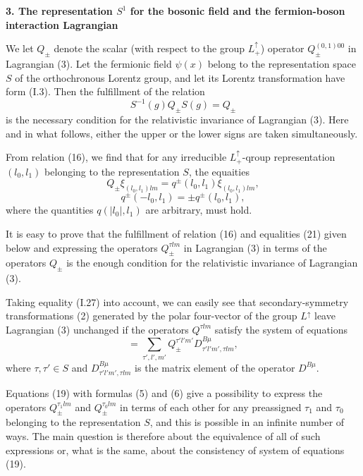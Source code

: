 \documentclass[a4paper,12pt]{article}
\begin{document}
\begin{center}
{\large \bf 3. The representation $S^{1}$ for the bosonic field and the
fermion-boson interaction Lagrangian}
\end{center}

We let $Q_{\pm}$ denote the scalar (with respect to the group 
$L^{\uparrow}_{+}$) operator $Q^{(0,1)00}_{\pm}$ in Lagrangian (3). Let the
fermionic field $\psi (x)$ belong to the representation space $S$ of the
orthochronous Lorentz group, and let its Lorentz transformation have form 
(I.3). Then the fulfillment of the relation
\begin{equation}
S^{-1}(g) Q_{\pm} S(g) = Q_{\pm}
\end{equation}
is the necessary condition for the relativistic invariance of Lagrangian (3).
Here and in what follows, either the upper or the lower signs are taken
simultaneously.

From relation (16), we find that for any irreducible $L^{\uparrow}_{+}$-qroup
representation $(l_{0},l_{1})$ belonging to the representation $S$, the
equaities 
\begin{equation}
Q_{\pm} \xi_{(l_{0},l_{1})lm} = q^{\pm}(l_{0},l_{1}) \xi_{(l_{0},l_{1})lm},
\end{equation}
\begin{equation}
q^{\pm}(-l_{0},l_{1}) = \pm q^{\pm}(l_{0},l_{1}),
\end{equation}
where the quantities $q(|l_{0}|,l_{1})$ are arbitrary, must hold.

It is easy to prove that the fulfillment of relation (16) and equalities (21)
given below and expressing the operators $Q^{\tau lm}_{\pm}$ in Lagrangian (3) 
in terms of the operators $Q_{\pm}$ is the enough condition for the
relativistic invariance of Lagrangian (3).

Taking equality (I.27) into account, we can easily see that secondary-symmetry
transformations (2) generated by the polar four-vector of the group
$L^{\uparrow}$ leave Lagrangian (3) unchanged if the operators $Q^{\tau lm}$
satisfy the system of equations
\begin{equation}
[D^{F \mu}, Q^{\tau lm}_{\pm}] =
\sum_{\tau',l',m'} Q^{\tau' l'm'}_{\pm} D^{B \mu}_{\tau' l'm', \tau lm},
\end{equation}
where $\tau, \tau' \in S$ and $D^{B \mu}_{\tau' l'm', \tau lm}$ is the matrix
element of the operator $D^{B \mu}$.

Equations (19) with formulas (5) and (6) give a possibility to express the
operators $Q^{\tau_{1} lm}_{\pm}$ and $Q^{\tau_{0} lm}_{\pm}$ in terms of each
other for any preassigned $\tau_{1}$ and $\tau_{0}$ belonging to the
representation $S$, and this is possible in an infinite number of ways. The
main question is therefore about the equivalence of all of such expressions or,
what is the same, about the consistency of system of equations (19).
\end{document}

